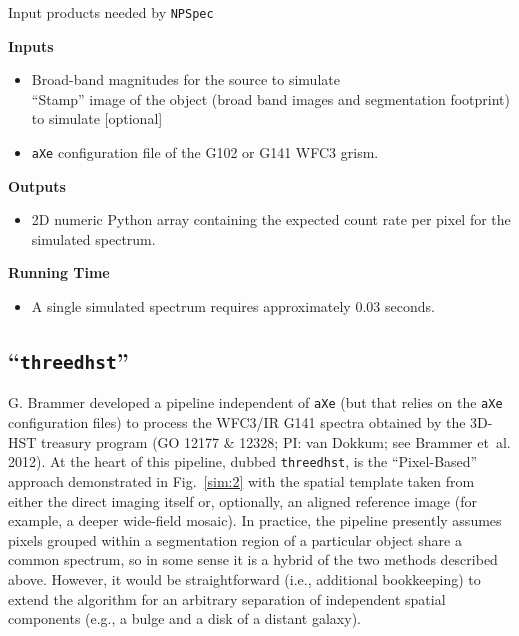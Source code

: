 \documentclass[preprint]{aastex}
\begin{document}
\centerline{Input products needed by \texttt{NPSpec}}
\noindent \textbf{Inputs}
\begin{itemize}
\item Broad-band magnitudes for the source to simulate\\
``Stamp'' image of the object (broad band images and segmentation footprint) to simulate [optional]\\
\item \texttt{aXe} configuration file of the G102 or G141 WFC3 grism.
\end{itemize}
\noindent \textbf{Outputs}
\begin{itemize}
\item 2D numeric Python array containing the expected count rate per pixel for the simulated spectrum.
\end{itemize}
\noindent \textbf{Running Time}
\begin{itemize}
\item A single simulated spectrum requires approximately 0.03 seconds.
\end{itemize}

\subsection{``\texttt{threedhst}''}

G. Brammer developed a pipeline independent of \texttt{aXe} (but that relies on the \texttt{aXe} configuration files) to process the WFC3/IR G141 spectra obtained by the 3D-HST treasury program (GO 12177 \& 12328; PI: van Dokkum; see Brammer et~al. 2012).  At the heart of this pipeline, dubbed \texttt{threedhst}, is the ``Pixel-Based'' approach demonstrated in Fig.~\ref{sim:2} with the spatial template taken from either the direct imaging itself or, optionally, an aligned reference image (for example, a deeper wide-field mosaic).  In practice, the pipeline presently assumes pixels grouped within a segmentation region of a particular object share a common spectrum, so in some sense it is a hybrid of the two methods described above.  However, it would be straightforward (i.e., additional bookkeeping) to extend the algorithm for an arbitrary separation of independent spatial components (e.g., a bulge and a disk of a distant galaxy).
\end{document}

